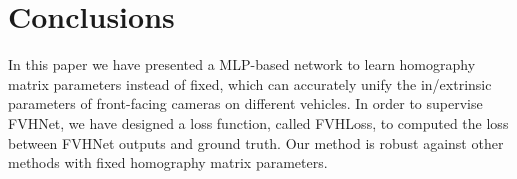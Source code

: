 \section{Conclusions}
In this paper we have presented a MLP-based network to learn homography matrix parameters instead of fixed,
which can accurately unify the in/extrinsic parameters of front-facing cameras on different vehicles.
In order to supervise FVHNet, we have designed a loss function, called FVHLoss, to computed the loss between FVHNet outputs and ground truth.
Our method is robust against other methods with fixed homography matrix parameters.